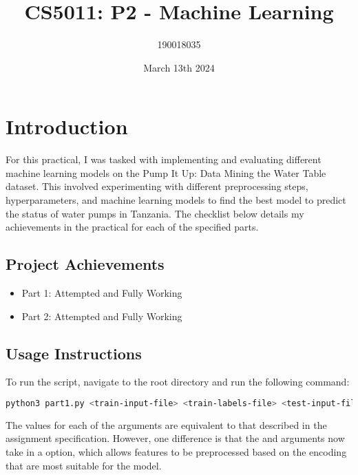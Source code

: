 \documentclass{article}
\title{CS5011: P2 - Machine Learning}
\author{190018035}
\date{March 13th 2024}
\begin{document}
\maketitle

\tableofcontents

\section{Introduction}
For this practical, I was tasked with implementing and evaluating different machine learning models on the Pump It Up: Data Mining the Water Table \cite{DrivenData} dataset. This involved experimenting with different preprocessing steps, hyperparameters, and machine learning models to find the best model to predict the status of water pumps in Tanzania. The checklist below details my achievements in the practical for each of the specified parts.

\subsection{Project Achievements}
\begin{itemize}
    \item{Part 1: Attempted and Fully Working}
    \item{Part 2: Attempted and Fully Working}
\end{itemize}

\subsection{Usage Instructions}

To run the script, navigate to the root directory and run the following command:

\begin{lstlisting}[language=bash]
python3 part1.py <train-input-file> <train-labels-file> <test-input-file> <numerical-preprocessing> <categorical-preprocessing> <model-type> <test-prediction-output-file>
\end{lstlisting}

\noindent The values for each of the arguments are equivalent to that described in the assignment specification. However, one difference is that the  and  arguments now take in a  option, which allows features to be preprocessed based on the encoding that are most suitable for the model. 
\end{document}

